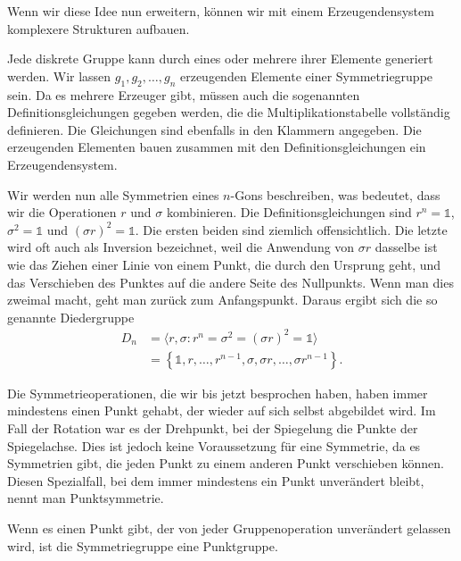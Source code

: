 Wenn wir diese Idee nun erweitern, können wir mit einem Erzeugendensystem
komplexere Strukturen aufbauen.

\begin{definition}[Erzeugendensystem]
  Jede diskrete Gruppe kann durch eines oder mehrere ihrer Elemente generiert werden.
  Wir lassen \(g_1, g_2, \ldots, g_n\) erzeugenden Elemente einer Symmetriegruppe sein.
  Da es mehrere Erzeuger gibt, müssen auch die sogenannten Definitionsgleichungen gegeben werden, die die Multiplikationstabelle vollständig definieren.
  Die Gleichungen sind ebenfalls in den Klammern angegeben.
  Die erzeugenden Elementen bauen zusammen mit den Definitionsgleichungen ein Erzeugendensystem.
\end{definition}
\begin{beispiel}
  Wir werden nun alle Symmetrien eines \(n\)-Gons beschreiben, was bedeutet, dass wir die Operationen \(r\) und \(\sigma\) kombinieren.
  Die Definitionsgleichungen sind \(r^n = \mathds{1}\), \(\sigma^2 = \mathds{1}\) und \((\sigma r)^2 = \mathds{1}\).
  Die ersten beiden sind ziemlich offensichtlich.
  Die letzte wird oft auch als Inversion bezeichnet, weil die Anwendung von \(\sigma r\) dasselbe ist wie das Ziehen einer Linie von einem Punkt, die durch den Ursprung geht, und das Verschieben des Punktes auf die andere Seite des Nullpunkts.
  Wenn man dies zweimal macht, geht man zurück zum Anfangspunkt.
  Daraus ergibt sich die so genannte Diedergruppe 
  \begin{align*}
    D_n &= \langle r, \sigma : r^n = \sigma^2 = (\sigma r)^2 = \mathds{1} \rangle \\
      &= \left\{
          \mathds{1}, r, \ldots, r^{n-1}, \sigma, \sigma r, \ldots, \sigma r^{n-1}
      \right\}.
  \end{align*} \qedhere
\end{beispiel}

Die Symmetrieoperationen, die wir bis jetzt besprochen haben, haben immer mindestens einen Punkt gehabt, der wieder auf sich selbst abgebildet wird.
Im Fall der Rotation war es der Drehpunkt, bei der Spiegelung die Punkte der Spiegelachse.
Dies ist jedoch keine Voraussetzung für eine Symmetrie, da es Symmetrien gibt, die jeden Punkt zu einem anderen Punkt verschieben können.
 Diesen Spezialfall, bei dem immer mindestens ein Punkt unverändert bleibt, nennt man Punktsymmetrie.
\begin{definition}[Punktgruppe]
  Wenn es einen Punkt gibt, der von jeder Gruppenoperation unverändert gelassen wird, ist die Symmetriegruppe eine Punktgruppe.
\end{definition}

